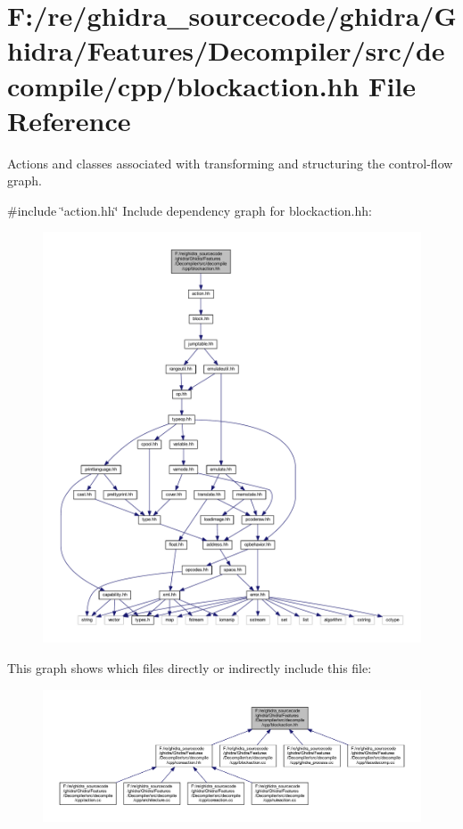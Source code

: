 \hypertarget{blockaction_8hh}{}\section{F\+:/re/ghidra\+\_\+sourcecode/ghidra/\+Ghidra/\+Features/\+Decompiler/src/decompile/cpp/blockaction.hh File Reference}
\label{blockaction_8hh}


Actions and classes associated with transforming and structuring the control-\/flow graph.  


{\ttfamily \#include \char`\"{}action.\+hh\char`\"{}}\newline
Include dependency graph for blockaction.\+hh\+:
\nopagebreak
\begin{figure}[H]
\begin{center}
\leavevmode
\includegraphics[width=350pt]{blockaction_8hh__incl}
\end{center}
\end{figure}
This graph shows which files directly or indirectly include this file\+:
\nopagebreak
\begin{figure}[H]
\begin{center}
\leavevmode
\includegraphics[width=350pt]{blockaction_8hh__dep__incl}
\end{center}
\end{figure}
